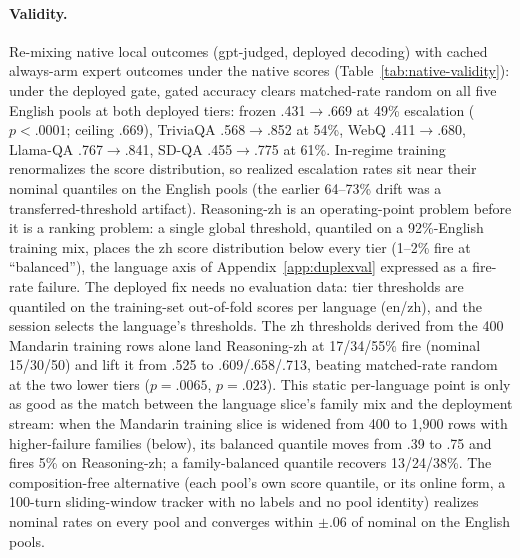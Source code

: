 \paragraph{Validity.} Re-mixing native local outcomes
(gpt-judged, deployed decoding) with cached always-arm expert
outcomes under the native scores
(Table~\ref{tab:native-validity}): under the deployed gate, gated accuracy clears matched-rate
random on all five English pools at both deployed tiers: frozen
.431$\to$.669 at 49\% escalation ($p{<}.0001$; ceiling .669),
TriviaQA .568$\to$.852 at 54\%, WebQ .411$\to$.680, Llama-QA
.767$\to$.841, SD-QA .455$\to$.775 at 61\%. In-regime training
renormalizes the score distribution, so realized escalation rates sit near
their nominal quantiles on the English pools (the earlier 64--73\%
drift was a transferred-threshold artifact). Reasoning-zh is an
operating-point problem before it is a ranking problem: a single
global threshold, quantiled on a 92\%-English training mix, places
the zh score distribution below every tier (1--2\% fire at
``balanced''), the language axis of Appendix~\ref{app:duplexval}
expressed as a fire-rate failure. The deployed fix needs no
evaluation data: tier thresholds are quantiled on the training-set
out-of-fold scores per language (en/zh), and the session
selects the language's thresholds. The zh thresholds derived from
the 400 Mandarin training rows alone land Reasoning-zh at 17/34/55\%
fire (nominal 15/30/50) and lift it from .525 to .609/.658/.713,
beating matched-rate random at the two lower tiers ($p{=}.0065$,
$p{=}.023$). This static per-language point is only as good as the
match between the language slice's family mix and the deployment
stream: when the Mandarin training slice is widened from 400 to
1{,}900 rows with higher-failure families (below), its balanced
quantile moves from .39 to .75 and fires 5\% on Reasoning-zh; a
family-balanced quantile recovers 13/24/38\%. The composition-free
alternative (each pool's own score quantile, or its online form, a
100-turn sliding-window tracker with no labels and no pool identity) realizes nominal rates on every pool and converges within
$\pm$.06 of nominal on the English pools.

